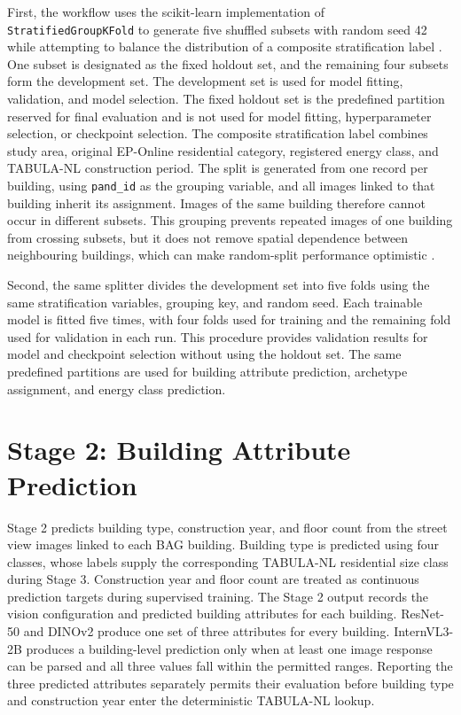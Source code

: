 First, the workflow uses the scikit-learn implementation of \texttt{StratifiedGroupKFold} to generate five shuffled subsets with random seed 42 while attempting to balance the distribution of a composite stratification label \parencite{pedregosa2011}.
One subset is designated as the fixed holdout set, and the remaining four subsets form the development set.
The development set is used for model fitting, validation, and model selection.
The fixed holdout set is the predefined partition reserved for final evaluation and is not used for model fitting, hyperparameter selection, or checkpoint selection.
The composite stratification label combines study area, original EP-Online residential category, registered energy class, and TABULA-NL construction period.
The split is generated from one record per building, using \texttt{pand\_id} as the grouping variable, and all images linked to that building inherit its assignment.
Images of the same building therefore cannot occur in different subsets.
This grouping prevents repeated images of one building from crossing subsets, but it does not remove spatial dependence between neighbouring buildings, which can make random-split performance optimistic \parencite{garbasevschi2021}.

Second, the same splitter divides the development set into five folds using the same stratification variables, grouping key, and random seed. Each trainable model is fitted five times, with four folds used for training and the remaining fold used for validation in each run. This procedure provides validation results for model and checkpoint selection without using the holdout set.
The same predefined partitions are used for building attribute prediction, archetype assignment, and energy class prediction.

\section{Stage 2: Building Attribute Prediction}
\label{sec:vision_inference_strategies}

Stage 2 predicts building type, construction year, and floor count from the street view images linked to each \acs{BAG} building.
Building type is predicted using four classes, whose labels supply the corresponding TABULA-NL residential size class during Stage 3.
Construction year and floor count are treated as continuous prediction targets during supervised training.
The Stage 2 output records the vision configuration and predicted building attributes for each building.
ResNet-50 and DINOv2 produce one set of three attributes for every building.
InternVL3-2B produces a building-level prediction only when at least one image response can be parsed and all three values fall within the permitted ranges.
Reporting the three predicted attributes separately permits their evaluation before building type and construction year enter the deterministic TABULA-NL lookup.

